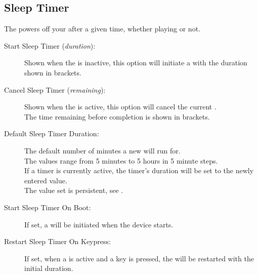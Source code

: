 \subsection{Sleep Timer}
  The  powers off your \dap{} after a given time, whether
  playing or not.
  \begin{description}
    \item[Start Sleep Timer (\emph{duration}):]
      Shown when the  is inactive, this option will
      initiate a  with the duration shown in brackets.
    \item[Cancel Sleep Timer (\emph{remaining}):]
      Shown when the  is active, this option will cancel
      the current .\\
      The time remaining before completion is shown in brackets.
    \item[Default Sleep Timer Duration:]
      The default number of minutes a new  will run
      for.\\
      The values range from 5 minutes to 5 hours in 5 minute steps.\\
      If a timer is currently active, the timer's duration will be set to the
      newly entered value.\\
      The value set is persistent, see .
    \item[Start Sleep Timer On Boot:]
      If set, a  will be initiated when the device
      starts.
    \item[Restart Sleep Timer On Keypress:]
      If set, when a  is active and a key is pressed, the
       will be restarted with the initial duration.
  \end{description}
